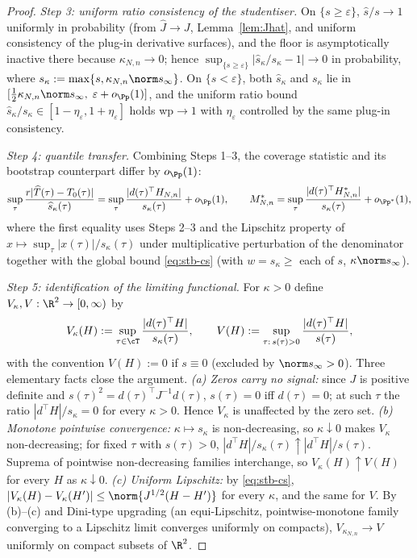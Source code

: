 \begin{proof}
\emph{Step 3: uniform ratio consistency of the studentiser.}
On $\{s\ge\varepsilon\}$, $\widehat s/s\to1$ uniformly in probability (from
$\widehat J\to J$, Lemma~\ref{lem:Jhat}, and uniform consistency of the
plug-in derivative surfaces), and the floor is asymptotically inactive there
because $\kappa_{N,n}\to0$; hence
$\sup_{\{s\ge\varepsilon\}}|\widehat s_\kappa/s_\kappa-1|\to0$ in
probability, where $s_\kappa:=\max\{s,\kappa_{N,n}\norm s_\infty\}$. On
$\{s<\varepsilon\}$, both $\widehat s_\kappa$ and $s_\kappa$ lie in
$[\tfrac12\kappa_{N,n}\norm s_\infty,\;\varepsilon+o_{\Pp}(1)]$, and the
uniform ratio bound
$\widehat s_\kappa/s_\kappa\in[1-\eta_\varepsilon,1+\eta_\varepsilon]$ holds
wp$\to1$ with $\eta_\varepsilon$ controlled by the same plug-in consistency.

\emph{Step 4: quantile transfer.}
Combining Steps 1--3, the coverage statistic and its bootstrap counterpart
differ by $o_{\Pp}(1)$:
\[
 \sup_\tau\frac{r|\widehat T(\tau)-T_0(\tau)|}{\widehat s_\kappa(\tau)}
 =\sup_\tau\frac{|d(\tau)^\top H_{N,n}|}{s_\kappa(\tau)}+o_{\Pp}(1),
 \qquad
 M^*_{N,n}
 =\sup_\tau\frac{|d(\tau)^\top H^*_{N,n}|}{s_\kappa(\tau)}
 +o_{\Pp^*}(1),
\]
where the first equality uses Steps 2--3 and the Lipschitz property of
$x\mapsto\sup_\tau|x(\tau)|/s_\kappa(\tau)$ under multiplicative
perturbation of the denominator together with the global bound
\eqref{eq:stb-cs} (with $w=s_\kappa\ge$ each of $s$,
$\kappa\norm s_\infty$).

\emph{Step 5: identification of the limiting functional.}
For $\kappa>0$ define $V_\kappa,V:\R^2\to[0,\infty)$ by
\[
 V_\kappa(H):=\sup_{\tau\in\cT}\frac{|d(\tau)^\top H|}{s_\kappa(\tau)},
 \qquad
 V(H):=\sup_{\tau:\,s(\tau)>0}\frac{|d(\tau)^\top H|}{s(\tau)},
\]
with the convention $V(H):=0$ if $s\equiv0$ (excluded by
$\norm s_\infty>0$). Three elementary facts close the argument.
\emph{(a) Zeros carry no signal:} since $J$ is positive definite and
$s(\tau)^2=d(\tau)^\top J^{-1}d(\tau)$, $s(\tau)=0$ iff $d(\tau)=0$; at such
$\tau$ the ratio $|d^\top H|/s_\kappa=0$ for every $\kappa>0$. Hence
$V_\kappa$ is unaffected by the zero set.
\emph{(b) Monotone pointwise convergence:} $\kappa\mapsto s_\kappa$ is
non-decreasing, so $\kappa\downarrow0$ makes $V_\kappa$ non-decreasing;
for fixed $\tau$ with $s(\tau)>0$,
$|d^\top H|/s_\kappa(\tau)\uparrow|d^\top H|/s(\tau)$. Suprema of
pointwise non-decreasing families interchange, so
$V_{\kappa}(H)\uparrow V(H)$ for every $H$ as $\kappa\downarrow0$.
\emph{(c) Uniform Lipschitz:} by \eqref{eq:stb-cs},
$|V_\kappa(H)-V_\kappa(H')|\le\norm{J^{1/2}(H-H')}$ for every $\kappa$, and
the same for $V$. By (b)--(c) and Dini-type upgrading (an equi-Lipschitz,
pointwise-monotone family converging to a Lipschitz limit converges
uniformly on compacts), $V_{\kappa_{N,n}}\to V$ uniformly on compact subsets
of $\R^2$.


\end{proof}
